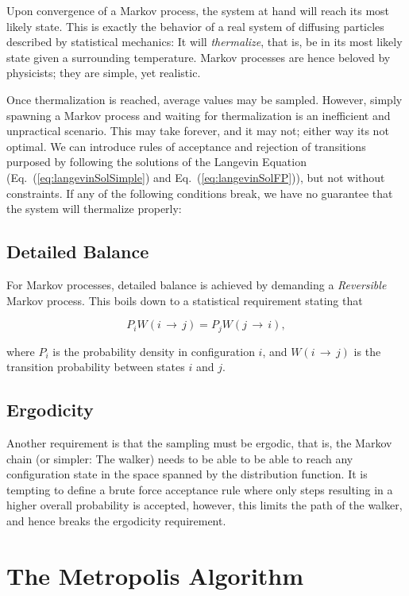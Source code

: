 Upon convergence of a Markov process, the system at hand will reach its most likely state. This is exactly the behavior of a real system of diffusing particles described by statistical mechanics: It will \textit{thermalize}, that is, be in its most likely state given a surrounding temperature. Markov processes are hence beloved by physicists; they are simple, yet realistic. 

Once thermalization is reached, average values may be sampled. However, simply spawning a Markov process and waiting for thermalization is an inefficient and unpractical scenario. This may take forever, and it may not; either way its not optimal. We can introduce rules of acceptance and rejection of transitions purposed by following the solutions of the Langevin Equation (Eq.~(\ref{eq:langevinSolSimple}) and Eq.~(\ref{eq:langevinSolFP})), but not without constraints. If any of the following conditions break, we have no guarantee that the system will thermalize properly:

\subsection{Detailed Balance} 

For Markov processes, detailed balance is achieved by demanding a \textit{Reversible} Markov process. This boils down to a statistical requirement stating that 

\begin{equation}
 \label{eq:DetailedBalance}
 P_iW(i\,\rightarrow\,j) = P_jW(j\,\rightarrow\,i),
\end{equation}

where $P_i$ is the probability density in configuration $i$, and $W(i\,\rightarrow\,j)$ is the transition probability between states $i$ and $j$. 

\subsection{Ergodicity}

Another requirement is that the sampling must be ergodic, that is, the Markov chain (or simpler: The walker) needs to be able to be able to reach any configuration state in the space spanned by the distribution function. It is tempting to define a brute force acceptance rule where only steps resulting in a higher overall probability is accepted, however, this limits the path of the walker, and hence breaks the ergodicity requirement.

\section{The Metropolis Algorithm}
\label{sec:MetroMain}

